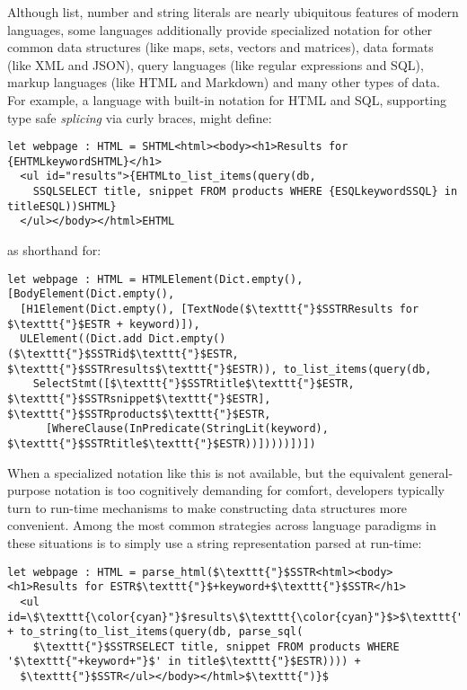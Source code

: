 
Although list, number and string literals are nearly ubiquitous features of modern languages, some languages additionally  provide specialized notation for other common data structures (like maps, sets, vectors and matrices), data formats (like XML and JSON), query languages (like regular expressions and SQL), markup languages (like HTML and Markdown) and many other types of data. For example, a language with built-in notation for HTML and SQL, supporting type safe \emph{splicing} via curly braces, might define:
\begin{lstlisting}
let webpage : HTML = SHTML<html><body><h1>Results for {EHTMLkeywordSHTML}</h1>
  <ul id="results">{EHTMLto_list_items(query(db, 
    SSQLSELECT title, snippet FROM products WHERE {ESQLkeywordSSQL} in titleESQL))SHTML}
  </ul></body></html>EHTML
\end{lstlisting}
as shorthand for:
\begin{lstlisting}
let webpage : HTML = HTMLElement(Dict.empty(), [BodyElement(Dict.empty(),
  [H1Element(Dict.empty(), [TextNode($\texttt{"}$SSTRResults for $\texttt{"}$ESTR + keyword)]), 
  ULElement((Dict.add Dict.empty() ($\texttt{"}$SSTRid$\texttt{"}$ESTR, $\texttt{"}$SSTRresults$\texttt{"}$ESTR)), to_list_items(query(db, 
    SelectStmt([$\texttt{"}$SSTRtitle$\texttt{"}$ESTR, $\texttt{"}$SSTRsnippet$\texttt{"}$ESTR], $\texttt{"}$SSTRproducts$\texttt{"}$ESTR, 
      [WhereClause(InPredicate(StringLit(keyword), $\texttt{"}$SSTRtitle$\texttt{"}$ESTR))]))))])])
\end{lstlisting}

When a specialized notation like this is not available, but the equivalent general-purpose notation is too cognitively demanding for comfort, developers typically turn to run-time mechanisms to make constructing data structures more convenient. Among the most common strategies across language paradigms in these situations is to simply use a string representation parsed at run-time:%
\begin{lstlisting}
let webpage : HTML = parse_html($\texttt{"}$SSTR<html><body><h1>Results for ESTR$\texttt{"}$+keyword+$\texttt{"}$SSTR</h1>
  <ul id=\$\texttt{\color{cyan}"}$results\$\texttt{\color{cyan}"}$>$\texttt{"}$ESTR + to_string(to_list_items(query(db, parse_sql(
  	$\texttt{"}$SSTRSELECT title, snippet FROM products WHERE '$\texttt{"+keyword+"}$' in title$\texttt{"}$ESTR)))) + 
  $\texttt{"}$SSTR</ul></body></html>$\texttt{")}$
\end{lstlisting}


